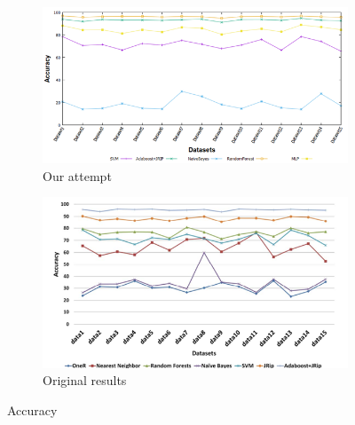 \begin{figure}[H]
    \centering
    \begin{subfigure}[t]{0.5\textwidth}
        \includegraphics[width=\linewidth]{images/weka_accuracy.png}
        \caption{Our attempt}
    \end{subfigure}%
    \begin{subfigure}[t]{0.5\textwidth}
        \includegraphics[width=\linewidth]{images/weka_accuracy_cite.png}
        \caption{Original results \cite{borges_hink_machine_2014-1}}
    \end{subfigure}
    \caption{Accuracy}
\end{figure}

